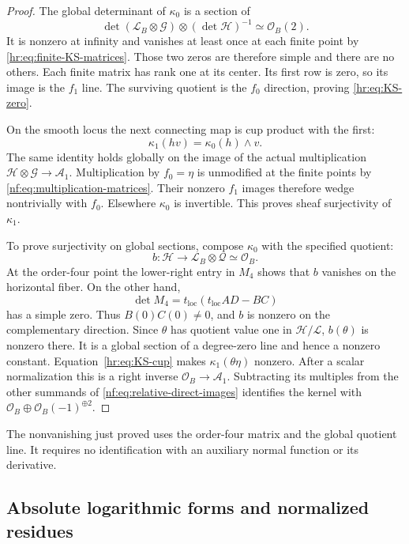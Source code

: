 \begin{proof}
The global determinant of $\kappa_0$ is a section of
\[
 \det(\mathscr L_B\otimes\mathcal G)\otimes
       (\det\mathcal H)^{-1}\simeq\mathcal O_B(2).
\]
It is nonzero at infinity and vanishes at least once at
each finite point by \eqref{hr:eq:finite-KS-matrices}.
Those two zeros are therefore simple and there are no
others. Each finite matrix has rank one at its center.
Its first row is zero, so its image is the $f_1$ line.
The surviving quotient is the $f_0$ direction, proving
\eqref{hr:eq:KS-zero}.

On the smooth locus the next connecting map is cup
product with the first:
\begin{equation}\label{hr:eq:KS-cup}
 \kappa_1(hv)=\kappa_0(h)\wedge v.
\end{equation}
The same identity holds globally on the image of the
actual multiplication
$\mathcal H\otimes\mathcal G\to\mathcal A_1$.
Multiplication by $f_0=\eta$ is unmodified at the finite
points by \eqref{nf:eq:multiplication-matrices}.
Their nonzero $f_1$ images therefore wedge nontrivially
with $f_0$. Elsewhere $\kappa_0$ is invertible.
This proves sheaf surjectivity of $\kappa_1$.

To prove surjectivity on global sections, compose
$\kappa_0$ with the specified quotient:
\[
 b:\mathcal H\longrightarrow
       \mathscr L_B\otimes\mathcal Q\simeq\mathcal O_B.
\]
At the order-four point the lower-right entry in $M_4$
shows that $b$ vanishes on the horizontal fiber.
On the other hand,
\[
 \det M_4=t_{\mathrm{loc}}
            (t_{\mathrm{loc}}AD-BC)
\]
has a simple zero. Thus $B(0)C(0)\ne0$, and $b$ is
nonzero on the complementary direction.
Since $\theta$ has quotient value one in
$\mathcal H/\mathcal L$, $b(\theta)$ is nonzero there.
It is a global section of a degree-zero line and hence
a nonzero constant. Equation~\eqref{hr:eq:KS-cup} makes
$\kappa_1(\theta\eta)$ nonzero. After a scalar
normalization this is a right inverse
$\mathcal O_B\to\mathcal A_1$.
Subtracting its multiples from the other summands of
\eqref{nf:eq:relative-direct-images} identifies the kernel
with $\mathcal O_B\oplus\mathcal O_B(-1)^{\oplus2}$.
\end{proof}

The nonvanishing just proved uses the order-four matrix
and the global quotient line. It requires no identification
with an auxiliary normal function or its derivative.

\subsection{Absolute logarithmic forms and normalized residues}

